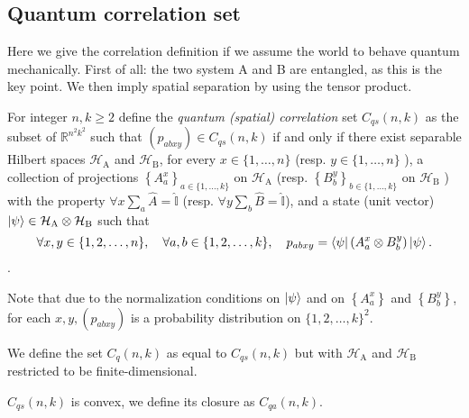 \subsection{Quantum correlation set}
Here we give the correlation definition if we assume the world to behave quantum mechanically. First of all: the two system A and B are entangled, as this is the key point. We then imply spatial separation by using the tensor product.


\begin{defn}\label{defn:quantum-correlation-set}
    For integer $n, k \geq 2$ define the \emph{quantum (spatial) correlation} set $C_{q s}(n, k)$ as the subset of $\mathbb{R}^{n^{2} k^{2}}$ such that $\left(p_{a b x y}\right) \in C_{q s}(n, k)$ if and only if there exist separable Hilbert spaces $\mathcal{H}_{\mathrm{A}}$ and $\mathcal{H}_{\mathrm{B}}$, for every $x \in\{1, \ldots, n\}$ (resp. $y \in\{1, \ldots, n\}$ ), a collection of projections $\left\{A_{a}^{x}\right\}_{a \in\{1, \ldots, k\}}$ on $\mathcal{H}_{\mathrm{A}}$ (resp. $\left\{B_{b}^{y}\right\}_{b \in\{1, \ldots, k\}}$ on $\mathcal{H}_{\mathrm{B}}$ ) with the property $\forall x \sum_a{\hat{A}} = \hat{\mathbb{I}}$ (resp. $\forall y \sum_b{\hat{B}} = \hat{\mathbb{I}}$), and a state (unit vector) $\ket{\psi} \in \mathcal{H}_{\mathrm{A}} \otimes \mathcal{H}_{\mathrm{B}}$ such that
    \begin{equation}
    \forall x, y \in\{1,2, \ldots, n\}, \quad \forall a, b \in\{1,2, \ldots, k\}, \quad p_{a b x y}=\bra{\psi}\left(A_{a}^{x} \otimes B_{b}^{y}\right) \ket{\psi} .
    \end{equation}.
\end{defn}

Note that due to the normalization conditions on $\ket{\psi}$ and on $\left\{A_{a}^{x}\right\}$ and $\left\{B_{b}^{y}\right\}$, for each $x, y,\left(p_{a b x y}\right)$ is a probability distribution on $\{1,2, \ldots, k\}^{2}$. 

\begin{defn}
We define the set $C_{q}(n, k)$ as equal to $C_{q s}(n, k)$ but with $\mathcal{H}_{\mathrm{A}}$ and $\mathcal{H}_{\mathrm{B}}$ restricted to be finite-dimensional.
\end{defn}

\begin{defn}
    $C_{q s}(n, k)$ is convex, we define its closure as $C_{q a}(n, k)$.
\end{defn}
